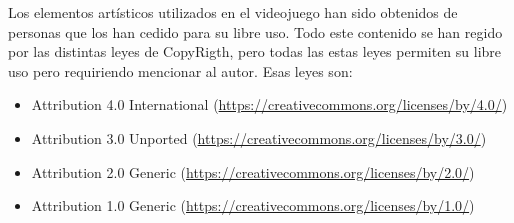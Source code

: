 Los elementos artísticos utilizados en el videojuego han sido obtenidos de personas que los han cedido para su libre uso. Todo este contenido se han regido por las distintas leyes de CopyRigth, pero todas las estas leyes permiten su libre uso pero requiriendo mencionar al autor. Esas leyes son:
\begin{itemize}
\item
Attribution 4.0 International (\url{https://creativecommons.org/licenses/by/4.0/})
\item
Attribution 3.0 Unported (\url{https://creativecommons.org/licenses/by/3.0/})
\item
Attribution 2.0 Generic (\url{https://creativecommons.org/licenses/by/2.0/})
\item
Attribution 1.0 Generic (\url{https://creativecommons.org/licenses/by/1.0/})
\end{itemize}